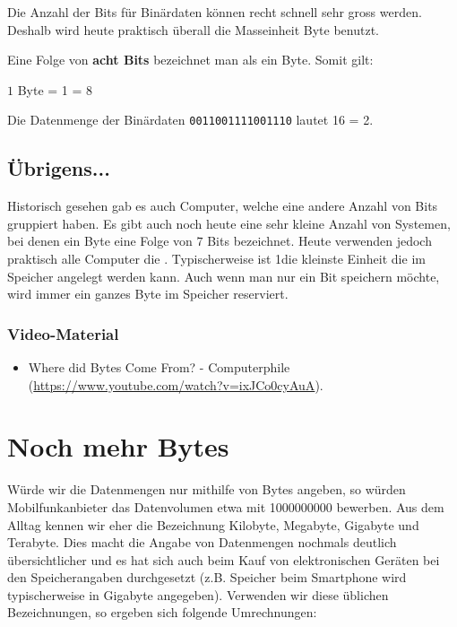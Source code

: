 Die Anzahl der Bits für Binärdaten können recht schnell sehr gross werden. Deshalb wird heute praktisch überall die Masseinheit Byte benutzt.

\begin{definition}[Byte]
Eine Folge von \textbf{acht Bits} bezeichnet man als ein Byte. Somit gilt:

\begin{center}
$1$ Byte = \qty{1}{\byte} = \qty{8}{\bit}
\end{center}

\end{definition}

\begin{example}
Die Datenmenge der Binärdaten \texttt{0011001111001110} lautet \qty{16}{\bit} = \qty{2}{\byte}.
\end{example}


\subsection{Übrigens...}

Historisch gesehen gab es auch Computer, welche eine andere Anzahl von Bits gruppiert haben. Es gibt auch noch heute eine sehr kleine Anzahl von Systemen, bei denen ein Byte eine Folge von $7$ Bits bezeichnet. Heute verwenden jedoch praktisch alle Computer die . Typischerweise ist \qty{1}{\byte}die kleinste Einheit die im Speicher angelegt werden kann. Auch wenn man nur ein Bit speichern möchte, wird immer ein ganzes Byte im Speicher reserviert. 

\subsubsection{Video-Material}

\begin{itemize}
\item Where did Bytes Come From? - Computerphile (\url{https://www.youtube.com/watch?v=ixJCo0cyAuA}).
\end{itemize}

\section{Noch mehr Bytes}
\label{sec-noch-mehr-bytes}

Würde wir die Datenmengen nur mithilfe von Bytes angeben, so würden Mobilfunkanbieter das Datenvolumen etwa mit \qty{1000000000}{\byte} bewerben. Aus dem Alltag kennen wir eher die Bezeichnung Kilobyte, Megabyte, Gigabyte und Terabyte. Dies macht die Angabe von Datenmengen nochmals deutlich übersichtlicher und es hat sich auch beim Kauf von elektronischen Geräten bei den Speicherangaben durchgesetzt (z.B. Speicher beim Smartphone wird typischerweise in Gigabyte angegeben). Verwenden wir diese üblichen Bezeichnungen, so ergeben sich folgende Umrechnungen:

